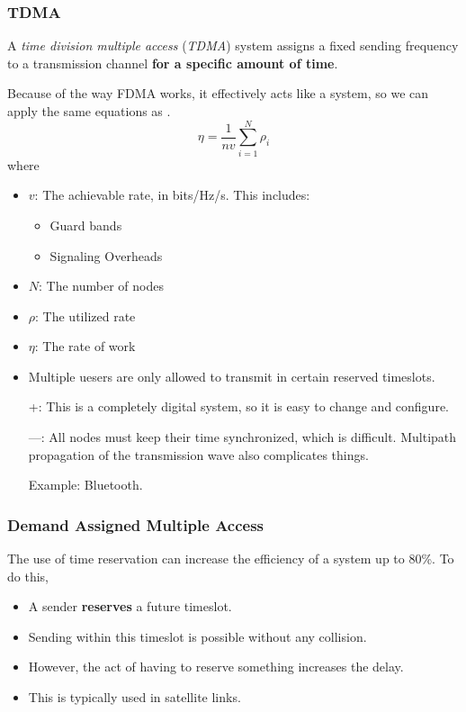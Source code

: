 \subsubsection{TDMA}\label{subsubsec:TDMA}
\begin{definition}\label{def:TDMA}
  A \emph{time division multiple access}  (\emph{TDMA}) system assigns a fixed sending frequency to a transmission channel \textbf{for a specific amount of time}.

  Because of the way FDMA works, it effectively acts like a  system, so we can apply the same equations as .
  \begin{equation}\label{eq:TDMA_Work_Rate}
    \eta = \frac{1}{n v} \sum\limits_{i=1}^{N} \rho_{i}
  \end{equation}
  where
  \begin{itemize}[noitemsep]
  \item $v$: The achievable rate, in bits/Hz/s. This includes:
    \begin{itemize}[noitemsep]
    \item Guard bands
    \item Signaling Overheads
    \end{itemize}
  \item $N$: The number of nodes
  \item $\rho$: The utilized rate
  \item $\eta$: The rate of work
  \end{itemize}

  \begin{itemize}[noitemsep]
  \item Multiple uesers are only allowed to transmit in certain reserved timeslots.
  \item [+:] This is a completely digital system, so it is easy to change and configure.
  \item [---:] All nodes must keep their time synchronized, which is difficult. Multipath propagation of the transmission wave also complicates things.
  \item [Example:] Bluetooth.
  \end{itemize}
\end{definition}

\subsubsection{Demand Assigned Multiple Access}\label{subsubsec:DAMA}
The use of time reservation can increase the efficiency of a system up to 80\%.
To do this,
\begin{itemize}[noitemsep]
\item A sender \textbf{reserves} a future timeslot.
\item Sending within this timeslot is possible without any collision.
\item However, the act of having to reserve something increases the delay.
\item This is typically used in satellite links.
\end{itemize}


